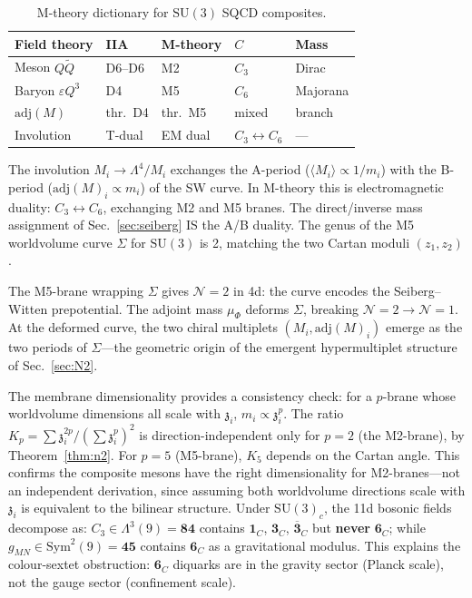 \documentclass[aps,prd,twocolumn,showpacs,preprintnumbers,superscriptaddress,floatfix]{revtex4-2}
\newcommand{\SU}{\mathrm{SU}}
\newcommand{\adj}{\mathrm{adj}}
\newcommand{\zch}{\mathfrak{z}}
\begin{document}
\begin{table}
\centering\small
\caption{M-theory dictionary for $\SU(3)$ SQCD composites.}
\label{tab:Mtheory}
\begin{tabular}{lllll}
\hline
Field theory & IIA & M-theory & $C$ & Mass \\
\hline
Meson $Q\tilde{Q}$ & D6--D6 & M2 & $C_3$ & Dirac \\
Baryon $\varepsilon Q^3$ & D4 & M5 & $C_6$ & Majorana \\
$\adj(M)$ & thr.\ D4 & thr.\ M5 & mixed & branch \\
Involution & T-dual & EM dual & $C_3{\leftrightarrow}C_6$ & --- \\
\hline
\end{tabular}
\end{table}
The involution $M_i \to \Lambda^4/M_i$ exchanges the A-period
($\langle M_i\rangle \propto 1/m_i$) with the B-period
($\adj(M)_i \propto m_i$) of the SW curve.
In M-theory this is electromagnetic duality: $C_3 \leftrightarrow
C_6$, exchanging M2 and M5 branes.
The direct/inverse mass assignment of Sec.~\ref{sec:seiberg} IS
the A/B duality.
The genus of the M5 worldvolume curve $\Sigma$ for $\SU(3)$ is
2, matching the two Cartan moduli $(z_1, z_2)$.

The M5-brane wrapping $\Sigma$ gives $\mathcal{N}{=}2$ in 4d:
the curve encodes the Seiberg--Witten prepotential.
The adjoint mass $\mu_\Phi$ deforms $\Sigma$, breaking
$\mathcal{N}{=}2 \to \mathcal{N}{=}1$.
At the deformed curve, the two chiral multiplets $(M_i,
\adj(M)_i)$ emerge as the two periods of $\Sigma$---the
geometric origin of the emergent hypermultiplet structure
of Sec.~\ref{sec:N2}.

The membrane dimensionality provides a consistency check: for a
$p$-brane whose worldvolume dimensions all scale with $\zch_i$,
$m_i \propto \zch_i^p$.
The ratio $K_p = \sum\zch_i^{2p}/(\sum\zch_i^p)^2$ is
direction-independent only for $p = 2$ (the M2-brane), by
Theorem~\ref{thm:n2}.
For $p = 5$ (M5-brane), $K_5$ depends on the Cartan angle.
This confirms the composite mesons have the right dimensionality
for M2-branes---not an independent derivation, since assuming
both worldvolume directions scale with $\zch_i$ is equivalent to
the bilinear structure.
Under $\SU(3)_c$, the 11d bosonic fields decompose as:
$C_3 \in \Lambda^3(9) = \mathbf{84}$ contains
$\mathbf{1}_C$, $\mathbf{3}_C$, $\overline{\mathbf{3}}_C$
but \textbf{never} $\mathbf{6}_C$; while
$g_{MN} \in \mathrm{Sym}^2(9) = \mathbf{45}$ contains
$\mathbf{6}_C$ as a gravitational modulus.
This explains the colour-sextet obstruction: $\mathbf{6}_C$
diquarks are in the gravity sector (Planck scale), not the
gauge sector (confinement scale).
\end{document}
